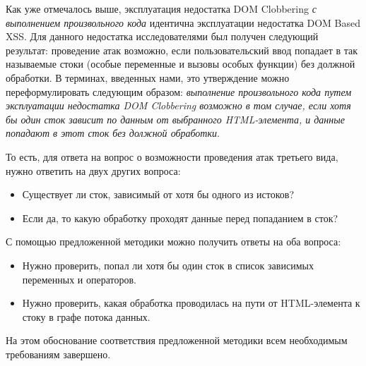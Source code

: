 \bigskip
Как уже отмечалось выше, эксплуатация недостатка DOM Clobbering \textit{с выполнением произвольного кода} идентична эксплуатации недостатка DOM Based XSS. Для данного недостатка исследователями \cite{vogt} \cite{domwiki} был получен следующий результат: проведение атак возможно, если пользовательский ввод попадает в так называемые стоки (особые переменные и вызовы особых функции) без должной обработки. В терминах, введенных нами, это утверждение можно переформулировать следующим образом: \textit{выполнение произвольного кода путем эксплуатации недостатка DOM Clobbering возможно в том случае, если хотя бы один сток зависит по данным от выбранного HTML-элемента, и данные попадают в этот сток без должной обработки}.


То есть, для ответа на вопрос о возможности проведения атак третьего вида, нужно ответить на двух других вопроса:
\begin{itemize}
	\item Существует ли сток, зависимый от хотя бы одного из истоков?
	\item Если да, то какую обработку проходят данные перед попаданием в сток?
\end{itemize}


С помощью предложенной методики можно получить ответы на оба вопроса:
\begin{itemize}
	\item Нужно проверить, попал ли хотя бы один сток в список зависимых переменных и операторов.
	\item Нужно проверить, какая обработка проводилась на пути от HTML-элемента к стоку в графе потока данных.
\end{itemize}
\bigskip

На этом обоснование соответствия предложенной методики всем необходимым требованиям завершено.

